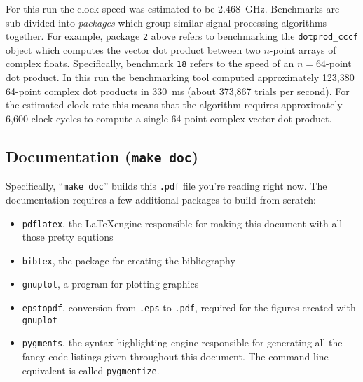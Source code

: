 %
For this run the clock speed was estimated to be 2.468~GHz.
Benchmarks are sub-divided into {\em packages} which group similar
signal processing algorithms together.
For example, package {\tt 2} above refers to benchmarking the
{\tt dotprod\_cccf} object which computes the vector dot product
between two $n$-point arrays of complex floats.
Specifically, benchmark {\tt 18} refers to the speed of an $n=64$-point
dot product.
In this run the benchmarking tool computed approximately 123,380
64-point complex dot products in 330~ms
(about 373,867 trials per second).
For the estimated clock rate this means that the algorithm requires
approximately 6,600 clock cycles to compute
a single 64-point complex vector dot product.

\subsection{Documentation ({\tt make doc})}
\label{section:installation:targets:doc}
Specifically, ``{\tt make doc}'' builds this {\tt .pdf} file you're
reading right now.
The documentation requires a few additional packages to build from
scratch:
%
\begin{itemize}
\item {\tt pdflatex}, the \LaTeX engine responsible for making this
      document with all those pretty equtions
\item {\tt bibtex}, the package for creating the bibliography
\item {\tt gnuplot}, a program for plotting graphics
\item {\tt epstopdf}, conversion from {\tt .eps} to {\tt .pdf}, required
      for the figures created with {\tt gnuplot}
\item {\tt pygments}, the syntax highlighting engine responsible for
      generating all the fancy code listings given throughout this
      document.
      The command-line equivalent is called {\tt pygmentize}.
\end{itemize}
%

